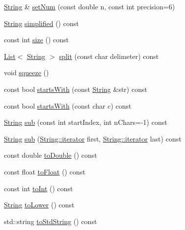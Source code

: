 \begin{DoxyCompactItemize}
\item 
\hyperlink{classprism_1_1_string}{String} \& \hyperlink{classprism_1_1_string_a2e346d9f08d74e3bbc0361b65692d846}{set\+Num} (const double n, const int precision=6)
\item 
\hyperlink{classprism_1_1_string}{String} \hyperlink{classprism_1_1_string_a6afd376891e93bc92379f25bc8e4cca0}{simplified} () const 
\item 
const int \hyperlink{classprism_1_1_string_a603b5a90681d43adf7c6c29018e0300c}{size} () const 
\item 
\hyperlink{classprism_1_1_list}{List}$<$ \hyperlink{classprism_1_1_string}{String} $>$ \hyperlink{classprism_1_1_string_a3db808efeefc30d17e7c59e0ae250525}{split} (const char delimeter) const 
\item 
void \hyperlink{classprism_1_1_string_a326c3afd3ed5b99dd53217e492526e0a}{squeeze} ()
\item 
const bool \hyperlink{classprism_1_1_string_ae9ce1b5a274fc4b672944da555552456}{starts\+With} (const \hyperlink{classprism_1_1_string}{String} \&str) const 
\item 
const bool \hyperlink{classprism_1_1_string_a5ce3cf5ba78faa6c9179fb777cc4c6ac}{starts\+With} (const char c) const 
\item 
\hyperlink{classprism_1_1_string}{String} \hyperlink{classprism_1_1_string_ab2224646e96ae71e4048e969da2fca93}{sub} (const int start\+Index, int n\+Chars=-\/1) const 
\item 
\hyperlink{classprism_1_1_string}{String} \hyperlink{classprism_1_1_string_acb6b7f719571cccca2f08887e61ed2a5}{sub} (\hyperlink{classprism_1_1_string_adacc7975837e5fff95d70690777fb330}{String\+::iterator} first, \hyperlink{classprism_1_1_string_adacc7975837e5fff95d70690777fb330}{String\+::iterator} last) const 
\item 
const double \hyperlink{classprism_1_1_string_a9c8060a9bea6e9967e8b9714c04d6396}{to\+Double} () const 
\item 
const float \hyperlink{classprism_1_1_string_a4fcdc9050798010ab0b36a6e4ff053c9}{to\+Float} () const 
\item 
const int \hyperlink{classprism_1_1_string_afbf22d03096777ef6909794edc18a0f9}{to\+Int} () const 
\item 
\hyperlink{classprism_1_1_string}{String} \hyperlink{classprism_1_1_string_ac75330b46da019ccf2c964e4c2fd9f81}{to\+Lower} () const 
\item 
std\+::string \hyperlink{classprism_1_1_string_ad1018741610a6723a38ab52255147ac4}{to\+Std\+String} () const 

\end{DoxyCompactItemize}
